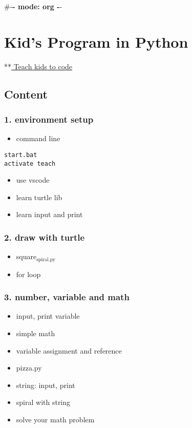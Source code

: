 \documentclass[11pt]{article}
\date{\today}
\title{}
\begin{document}
\tableofcontents

\#-\textbf{- mode: org -}-


\section{Kid's Program in Python}
\label{sec:orge0f64dc}

**\href{teach\_your\_kids\_to\_code\_a\_parent-friendly\_guide\_to\_python\_programming\_\_2015\_.pdf}{ Teach kids to code}

\subsection{Content}
\label{sec:orgb13f113}

\subsubsection{1. environment setup}
\label{sec:org94ed2f9}
\begin{itemize}
\item command line
\end{itemize}

\begin{verbatim}
start.bat
activate teach
\end{verbatim}

\begin{itemize}
\item use vscode
\item learn turtle lib
\item learn input and print
\end{itemize}

\subsubsection{2. draw with turtle}
\label{sec:org0e25e77}
\begin{itemize}
\item square\(_{\text{spiral.py}}\)
\item for loop
\end{itemize}

\subsubsection{3. number, variable and math}
\label{sec:org79e335b}
\begin{itemize}
\item input, print variable
\item simple math
\item variable assignment and reference
\item pizza.py
\item string: input, print
\item spiral with string
\item solve your math problem
\end{itemize}
\end{document}
